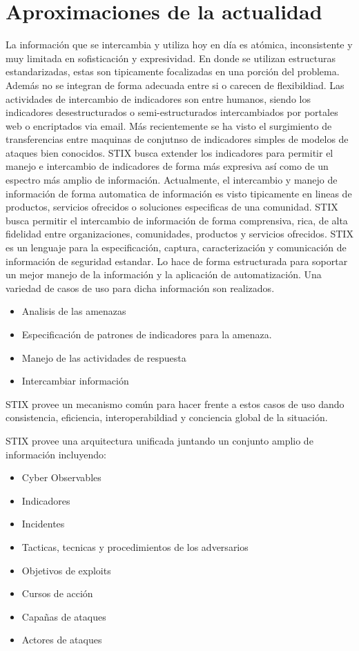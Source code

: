 \section{Aproximaciones de la actualidad}
La información que se intercambia y utiliza hoy en día es atómica, 
inconsistente y muy limitada en sofisticación y expresividad. En donde se 
utilizan estructuras estandarizadas, estas son tipicamente focalizadas en una 
porción del problema. Además no se integran de forma adecuada entre si o carecen 
de flexibildiad. Las actividades de intercambio de indicadores son entre 
humanos, siendo los indicadores desestructurados o semi-estructurados 
intercambiados por portales web o encriptados via email. Más recientemente se 
ha visto el surgimiento de transferencias entre maquinas de conjutnso de 
indicadores simples de modelos de ataques bien conocidos.
STIX busca extender los indicadores para permitir el manejo e intercambio de 
indicadores de forma más expresiva así como de un espectro más amplio de 
información.
Actualmente, el intercambio y manejo de información de forma automatica de 
información es visto tipicamente en lineas de productos, servicios ofrecidos o 
soluciones especificas de una comunidad. STIX busca permitir el intercambio de 
información de forma comprensiva, rica, de alta fidelidad entre organizaciones, 
comunidades, productos y servicios ofrecidos. STIX es un lenguaje para la 
especificación, captura, caracterización y comunicación de información de 
seguridad estandar. Lo hace de forma estructurada para soportar un mejor manejo 
de la información y la aplicación de automatización. Una variedad de casos de 
uso para dicha información son realizados.
\begin{itemize}
  \item Analisis de las amenazas
  \item Especificación de patrones de indicadores para la amenaza.
  \item Manejo de las actividades de respuesta
  \item Intercambiar información
\end{itemize}

STIX provee un mecanismo común para hacer frente a estos casos de uso dando 
consistencia, eficiencia, interoperabildiad y conciencia global de la situación.

STIX provee una arquitectura unificada juntando un conjunto amplio de 
información incluyendo:
\begin{itemize}
  \item Cyber Observables
  \item Indicadores
  \item Incidentes
  \item Tacticas, tecnicas y procedimientos de los adversarios
  \item Objetivos de exploits
  \item Cursos de acción
  \item Capañas de ataques
  \item Actores de ataques
\end{itemize}

